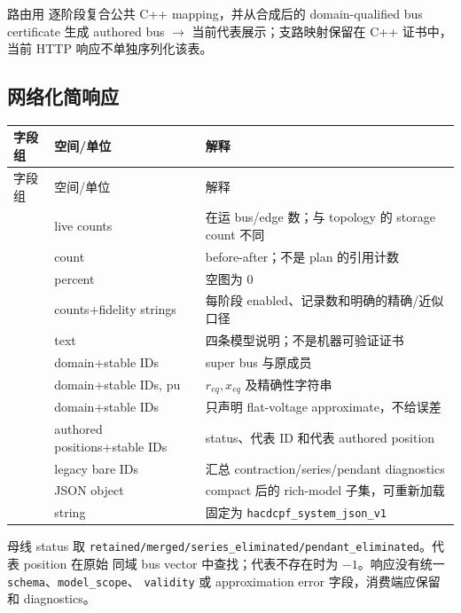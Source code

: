 路由用  逐阶段复合公共 C++ mapping，并从合成后的
domain-qualified bus certificate 生成 authored bus $\to$ 当前代表展示；支路映射保留在 C++ 证书中，
当前 HTTP 响应不单独序列化该表。

\subsection{网络化简响应}

\begin{longtable}{@{}L{4.4cm}L{4.4cm}L{5.4cm}@{}}
\toprule
字段组 & 空间/单位 & 解释\\
\midrule
\endfirsthead
\toprule
字段组 & 空间/单位 & 解释\\
\midrule
\endhead
{} & live counts & 在运 bus/edge 数；与 topology 的 storage count 不同\\
 & count & before-after；不是 plan 的引用计数\\
 & percent & 空图为 0\\
 & counts+fidelity strings & 每阶段 enabled、记录数和明确的精确/近似口径\\
 & text & 四条模型说明；不是机器可验证证书\\
 & domain+stable IDs & super bus 与原成员\\
 & domain+stable IDs, pu & $r_{eq},x_{eq}$ 及精确性字符串\\
 & domain+stable IDs & 只声明 flat-voltage approximate，不给误差\\
 & authored positions+stable IDs & status、代表 ID 和代表 authored position\\
 & legacy bare IDs & 汇总 contraction/series/pendant diagnostics\\
 & JSON object & compact 后的 rich-model 子集，可重新加载\\
 & string & 固定为 \texttt{hacdcpf\_system\_json\_v1}\\
\bottomrule
\end{longtable}

母线 status 取 \texttt{retained/merged/series\_eliminated/pendant\_eliminated}。代表 position 在原始
同域 bus vector 中查找；代表不存在时为 $-1$。响应没有统一 \texttt{schema}、\texttt{model\_scope}、
\texttt{validity} 或 approximation error 字段，消费端应保留  和 diagnostics。

